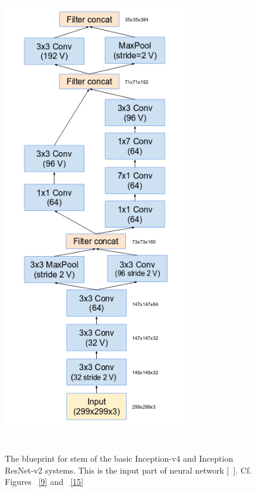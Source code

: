 \documentclass[a4paper,12pt, twoside]{NITKReport}
\begin{document}
\begin{figure}[h]
  \centering
    
    \includegraphics[height=21cm, width=8cm]{figure3.png}
    \caption{The blueprint for stem of the basic Inception-v4 and 
Inception ResNet-v2 systems. This is the input part of neural network [~\cite{szegedy2017inception}]. Cf. Figures ~\ref{9} and ~\ref{15}}
    \label{3}
  
\end{figure}
\end{document}
